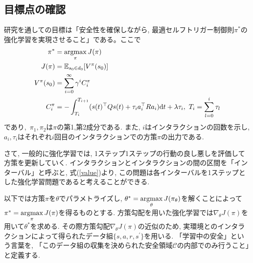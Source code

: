 \documentclass{jsarticle}
\newcommand{\argmax}{\mathop{\rm argmax}\limits}
\newcommand{\expect}{\mathbb{E}}
\begin{document}
\subsection{目標点の確認}
研究を通しての目標は「安全性を確保しながら, 最適セルフトリガー制御則$\pi^{*}$の強化学習を実現させること」である。ここで
\begin{align}
	\pi^{*} &= \argmax_{\pi}J(\pi) \\
	J(\pi) &= \expect_{s_0\in d_0}[V^{\pi}(s_0)] \\
	V^{\pi}(s_0) &= \sum_{i=0}^{\infty} \gamma^i C^{\pi}_i \label{value} \\
	C^{\pi}_i &= -\int_{T_i}^{T_{i+1}}(s(t)^{\top}Qs(t)+\tau_ia_i^{\top}Ra_i)\textrm{d}t + \lambda \tau_i, ~T_i = \sum_{l=0}^{i} \tau_l \label{reward}
\end{align}
であり,~$\pi_1, \pi_2$は$\pi$の第1,第2成分である. また, $i$はインタラクションの回数を示し, $a_i, \tau_i$はそれぞれ$i$回目のインタラクションでの方策$\pi$の出力である. \par
さて, 一般的に強化学習では, 1ステップ1ステップの行動の良し悪しを評価して方策を更新していく. 
インタラクションとインタラクションの間の区間を「インターバル」と呼ぶと, 式(\ref{value})より, この問題は各インターバルを1ステップとした強化学習問題であると考えることができる. \par
以下では方策$\pi$を$\theta$でパラメトライズし, $\theta^{*} = \argmax_{\theta}J(\pi_{\theta})$を解くことによって$\pi^{*} = \argmax_{\pi}J(\pi)$を得るものとする. 方策勾配を用いた強化学習では$\nabla_{\theta}J(\pi)$を用いて$\theta^{*}$を求める. その際方策勾配$\nabla_{\theta}J(\pi)$の近似のため, 実環境とのインタラクションによって得られたデータ組$\{s,a,r,s^{\prime}\}$を用いる. 「学習中の安全」という言葉を, 「このデータ組の収集を決められた安全領域$\mathcal{C}$の内部でのみ行うこと」と定義する.\par
\end{document}
